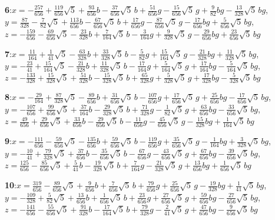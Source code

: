 \documentclass[10pt]{article}
\begin{document}
{\noindent\textbf{6}:\quad $x=-\tfrac{257}{656}+\tfrac{119}{656}\sqrt5+\tfrac{93}{656}b-\tfrac{37}{656}\sqrt5\,b+\tfrac{51}{656}g-\tfrac{15}{656}\sqrt5\,g+\tfrac{9}{82}bg-\tfrac{13}{328}\sqrt5\,bg$,\quad $y=\tfrac{87}{328}-\tfrac{7}{82}\sqrt5+\tfrac{113}{656}b-\tfrac{67}{656}\sqrt5\,b+\tfrac{17}{656}g-\tfrac{87}{656}\sqrt5\,g-\tfrac{17}{656}bg+\tfrac{5}{656}\sqrt5\,bg$,\quad $z=-\tfrac{159}{656}-\tfrac{69}{656}\sqrt5-\tfrac{23}{328}b+\tfrac{7}{164}\sqrt5\,b-\tfrac{3}{164}g+\tfrac{9}{328}\sqrt5\,g-\tfrac{29}{656}bg+\tfrac{23}{656}\sqrt5\,bg$\par\smallskip
\noindent\textbf{7}:\quad $x=\tfrac{11}{164}+\tfrac{1}{41}\sqrt5-\tfrac{63}{328}b+\tfrac{33}{328}\sqrt5\,b-\tfrac{5}{82}g+\tfrac{15}{164}\sqrt5\,g-\tfrac{21}{328}bg+\tfrac{11}{328}\sqrt5\,bg$,\quad $y=-\tfrac{23}{41}+\tfrac{15}{164}\sqrt5-\tfrac{21}{328}b+\tfrac{11}{328}\sqrt5\,b-\tfrac{17}{164}g+\tfrac{5}{164}\sqrt5\,g+\tfrac{17}{164}bg-\tfrac{5}{164}\sqrt5\,bg$,\quad $z=-\tfrac{133}{328}+\tfrac{15}{328}\sqrt5+\tfrac{51}{328}b-\tfrac{15}{328}\sqrt5\,b+\tfrac{65}{328}g+\tfrac{5}{328}\sqrt5\,g+\tfrac{17}{328}bg-\tfrac{5}{328}\sqrt5\,bg$\par\smallskip
\noindent\textbf{8}:\quad $x=-\tfrac{29}{164}+\tfrac{87}{328}\sqrt5-\tfrac{89}{656}b+\tfrac{31}{656}\sqrt5\,b-\tfrac{107}{656}g+\tfrac{17}{656}\sqrt5\,g+\tfrac{25}{656}bg-\tfrac{17}{656}\sqrt5\,bg$,\quad $y=-\tfrac{107}{656}+\tfrac{99}{656}\sqrt5+\tfrac{37}{164}b-\tfrac{29}{328}\sqrt5\,b+\tfrac{71}{328}g-\tfrac{1}{82}\sqrt5\,g+\tfrac{63}{656}bg-\tfrac{33}{656}\sqrt5\,bg$,\quad $z=\tfrac{49}{656}+\tfrac{29}{656}\sqrt5+\tfrac{33}{656}b-\tfrac{29}{656}\sqrt5\,b-\tfrac{11}{656}g-\tfrac{45}{656}\sqrt5\,g-\tfrac{15}{328}bg+\tfrac{1}{164}\sqrt5\,bg$\par\smallskip
\noindent\textbf{9}:\quad $x=-\tfrac{111}{656}-\tfrac{59}{656}\sqrt5-\tfrac{135}{656}b+\tfrac{59}{656}\sqrt5\,b-\tfrac{119}{656}g+\tfrac{35}{656}\sqrt5\,g-\tfrac{1}{164}bg+\tfrac{3}{328}\sqrt5\,bg$,\quad $y=-\tfrac{10}{41}+\tfrac{79}{328}\sqrt5+\tfrac{37}{656}b-\tfrac{35}{656}\sqrt5\,b-\tfrac{67}{656}g-\tfrac{43}{656}\sqrt5\,g+\tfrac{67}{656}bg-\tfrac{39}{656}\sqrt5\,bg$,\quad $z=\tfrac{125}{656}-\tfrac{85}{656}\sqrt5+\tfrac{5}{41}b-\tfrac{19}{328}\sqrt5\,b+\tfrac{7}{164}g-\tfrac{21}{328}\sqrt5\,g+\tfrac{13}{656}bg+\tfrac{1}{656}\sqrt5\,bg$\par\smallskip
\noindent\textbf{10}:\quad $x=\tfrac{319}{656}-\tfrac{89}{656}\sqrt5+\tfrac{9}{656}b+\tfrac{7}{656}\sqrt5\,b+\tfrac{79}{656}g+\tfrac{25}{656}\sqrt5\,g-\tfrac{19}{328}bg+\tfrac{1}{41}\sqrt5\,bg$,\quad $y=-\tfrac{109}{328}+\tfrac{5}{82}\sqrt5+\tfrac{13}{656}b+\tfrac{1}{656}\sqrt5\,b+\tfrac{23}{656}g+\tfrac{27}{656}\sqrt5\,g+\tfrac{59}{656}bg-\tfrac{27}{656}\sqrt5\,bg$,\quad $z=-\tfrac{141}{656}-\tfrac{55}{656}\sqrt5+\tfrac{91}{328}b-\tfrac{17}{164}\sqrt5\,b+\tfrac{79}{328}g-\tfrac{2}{41}\sqrt5\,g+\tfrac{47}{656}bg-\tfrac{9}{656}\sqrt5\,bg$\par\smallskip
}
\end{document}
